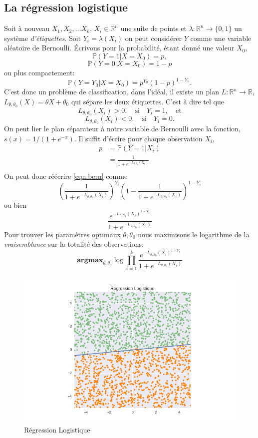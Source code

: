 \documentclass[DIV=calc, paper=a4, fontsize=11pt, twocolumn]{scrartcl}
\begin{document}
\subsection{La régression logistique}
Soit à nouveau $X_1, X_2, \ldots X_k$, $X_i \in \mathbb{R}^n$ une suite de points et $\lambda : \mathbb{R}^n \to \{0,1\}$ un système \emph{d'étiquettes}. Soit $Y_i = \lambda(X_i)$ on peut considérer $Y$ comme une variable aléatoire de Bernoulli. Écrivons pour la probabilité, étant donné une valeur $X_0$,
$$\mathbb{P}(Y=1| X = X_0) = p,$$
$$\mathbb{P}(Y=0| X = X_0) = 1-p$$
ou plus compactement:
\begin{equation}
\mathbb{P}(Y=Y_0| X = X_0) = p^{Y_0}(1-p)^{1-Y_0}.
\label{eqn:bern}
\end{equation}
C'est donc un problème de classification, dans l'idéal, il existe un plan $L: \mathbb{R}^n \to \mathbb{R}$, $L_{\theta, \theta_0}(X) = \theta X + \theta_0$ qui sépare les deux étiquettes. C'est à dire tel que
$$ L_{\theta, \theta_0}(X_i) > 0, \quad \text{si} \quad Y_i = 1, \quad \text{et}$$
$$ L_{\theta, \theta_0}(X_i) < 0, \quad \text{si} \quad Y_i = 0.$$
On peut lier le plan séparateur à notre variable de Bernoulli avec la fonction, $s(x) = 1/(1+ e^{-x})$. Il suffit d'écrire pour chaque observation $X_i$, 
\begin{align*}
p &= \mathbb{P}(Y=1|X_i)\\
                    &= \frac{1}{1+ e^{-L_{\theta, \theta_0}(X_i)}}\\
\end{align*}
On peut donc réécrire \ref{eqn:bern} comme
$$\left( \frac{1}{1 + e^{-L_{\theta, \theta_0}(X_i) }} \right)^{Y_i} \left ( 1- \frac{1}{1 + e^{-L_{\theta, \theta_0}(X_i) }} \right)^{1 - Y_i} $$
ou bien
$$\frac{e^{-L_{\theta, \theta_0} (X_i)^{1-Y_i}}}{1 + e^{-L_{\theta, \theta_0}(X_i)}}$$
Pour trouver les paramètres optimaux $\theta, \theta_0$ nous maximisons le logarithme de la \emph{vraisemblance} sur la totalité des observations:
$$\textbf{argmax}_{\theta, \theta_0}\log \prod_{i=1}^k \frac{e^{-L_{\theta, \theta_0} (X_i)^{1-Y_i}}}{1 + e^{-L_{\theta, \theta_0}(X_i)}}$$
\begin{figure}
  \centering
    \includegraphics[width=\linewidth]{reglog}
  \caption{Régression Logistique}
  \label{fig:reglog}
\end{figure}
\end{document}
